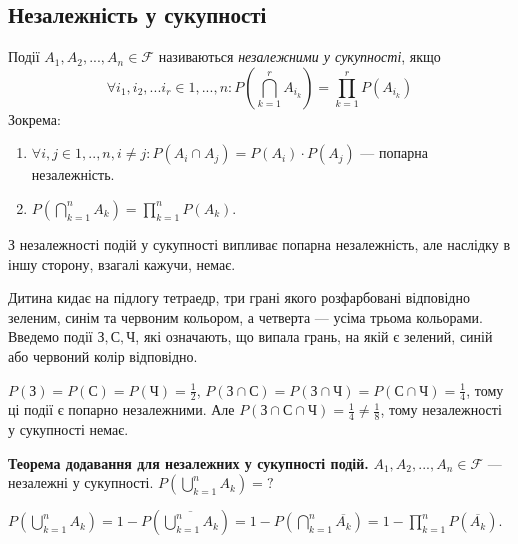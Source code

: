 \subsection{Незалежність у сукупності}
\begin{definition}
    Події $A_1, A_2, ..., A_n \in \mathcal{F}$ називаються \emph{незалежними у сукупності}, якщо
    \begin{equation}\label{eq:indep}
        \forall i_1, i_2, ... i_r \in {1,...,n}: P\left(\bigcap\limits_{k=1}^r A_{i_k}\right) = \prod\limits_{k=1}^r P\left(A_{i_k}\right)
    \end{equation}
    Зокрема:
    \nopagebreak
    \begin{enumerate}
        \item $\forall i, j \in {1,..,n}, i\neq j: P(A_i \cap A_j) = P(A_i)\cdot P(A_j)$ --- попарна незалежність.
        \item $P\left(\bigcap\limits_{k=1}^n A_k\right) = \prod\limits_{k=1}^n P(A_k)$.
    \end{enumerate}
\end{definition}
\begin{remark}
    З незалежності подій у сукупності випливає попарна незалежність, 
    але наслідку в іншу сторону, взагалі кажучи, немає.
\end{remark}
\begin{example}
    Дитина кидає на підлогу тетраедр, три грані якого розфарбовані відповідно зеленим, синім та червоним кольором,
    а четверта --- усіма трьома кольорами. Введемо події $\text{З}, \text{С}, \text{Ч}$, які означають, що випала грань,
    на якій є зелений, синій або червоний колір відповідно.

    $P(\text{З}) = P(\text{С}) = P(\text{Ч}) = \frac{1}{2}$, 
    $P(\text{З} \cap \text{С}) = P(\text{З} \cap \text{Ч}) = P(\text{С} \cap \text{Ч}) = \frac{1}{4}$,
    тому ці події є попарно незалежними. Але $P(\text{З} \cap \text{С} \cap \text{Ч}) = \frac{1}{4} \neq \frac{1}{8}$,
    тому незалежності у сукупності немає.
\end{example}

\noindent \textbf{Теорема додавання для незалежних у сукупності подій.}
$A_1, A_2, ..., A_n \in \mathcal{F}$ --- незалежні у сукупності.
$P\left(\bigcup\limits_{k=1}^n A_k\right) = \text{?}$

$P\left(\bigcup\limits_{k=1}^n A_k\right) = 1 - P\left(\overline{\bigcup\limits_{k=1}^n A_k}\right) = 1 - P\left(\bigcap\limits_{k=1}^n \overline{A_k}\right) = 1 - \prod\limits_{k=1}^n P(\overline{A_k})$.

